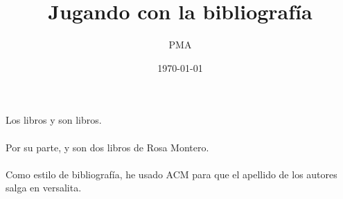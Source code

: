 \documentclass[12pt,a4paper]{article}
\begin{document}
	\title{Jugando con la bibliografía}
	\author{PMA}
	\date{\today}
	\maketitle
	
	
	

Los libros \cite{Cepeda2013} y \cite{Cisneros1984} son libros. \\ \\

Por su parte, \cite{Montero1988} y \cite{Montero2005} son dos libros de Rosa Montero. \\ \\

Como estilo de bibliografía, he usado ACM para que el apellido de los autores salga en versalita. 
	
\end{document}
